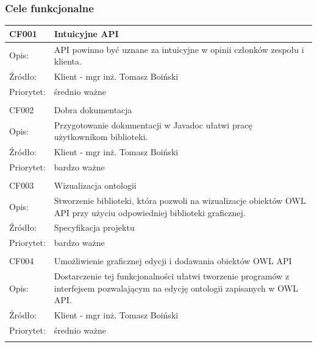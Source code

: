 \subsubsection{Cele funkcjonalne}


\begin{center}

\begin{tabular}{|m{3cm}|m{9cm}|} \hline

CF001 & Intuicyjne API \\ \hline
Opis: & API powinno być uznane za intuicyjne w opinii członków zespołu i klienta. \\ \hline
Źródło: & Klient - mgr inż. Tomasz Boiński \\ \hline
Priorytet: & średnio ważne  \\ \hline
\multicolumn{2}{c}{} \\

 \hline
CF002 & Dobra dokumentacja \\ \hline
Opis: & Przygotowanie dokumentacji w Javadoc ułatwi pracę użytkownikom biblioteki. \\ \hline
Źródło: & Klient - mgr inż. Tomasz Boiński  \\ \hline
Priorytet: & bardzo ważne \\ \hline

\multicolumn{2}{c}{} \\
 \hline
CF003 & Wizualizacja ontologii \\ \hline
Opis: & Stworzenie biblioteki, która pozwoli na wizualizacje obiektów OWL API przy użyciu odpowiedniej biblioteki graficznej. \\ \hline
Źródło:  & Specyfikacja projektu  \\ \hline
Priorytet: & bardzo ważne \\ \hline

\multicolumn{2}{c}{} \\
 \hline
CF004 & Umożliwienie graficznej edycji i dodawania obiektów OWL API \\ \hline
Opis: &  Dostarczenie tej funkcjonalności ułatwi tworzenie programów z interfejsem pozwalającym na edycję ontologii zapisanych w OWL API. \\ \hline
Źródło: & Klient - mgr inż. Tomasz Boiński \\ \hline
Priorytet: & średnio ważne \\ \hline
\multicolumn{2}{c}{} \\



\end{tabular}
\end{center}
